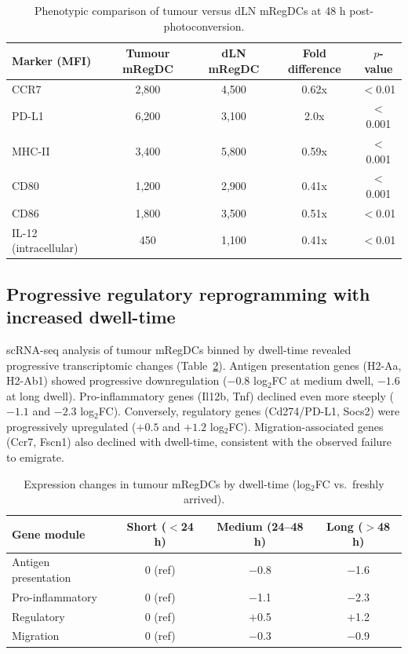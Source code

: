 \documentclass[11pt]{article}
\begin{document}
\begin{table}[h]
\centering
\caption{Phenotypic comparison of tumour versus dLN mRegDCs at 48 h post-photoconversion.}
\label{tab:phenotype}
\begin{tabular}{lcccc}
\toprule
Marker (MFI) & Tumour mRegDC & dLN mRegDC & Fold difference & $p$-value \\
\midrule
CCR7 & 2,800 & 4,500 & 0.62x & $<$0.01 \\
PD-L1 & 6,200 & 3,100 & 2.0x & $<$0.001 \\
MHC-II & 3,400 & 5,800 & 0.59x & $<$0.001 \\
CD80 & 1,200 & 2,900 & 0.41x & $<$0.001 \\
CD86 & 1,800 & 3,500 & 0.51x & $<$0.01 \\
IL-12 (intracellular) & 450 & 1,100 & 0.41x & $<$0.01 \\
\bottomrule
\end{tabular}
\end{table}

\subsection{Progressive regulatory reprogramming with increased dwell-time}
scRNA-seq analysis of tumour mRegDCs binned by dwell-time revealed progressive transcriptomic changes (Table~\ref{tab:temporal}). Antigen presentation genes (H2-Aa, H2-Ab1) showed progressive downregulation ($-0.8$ log$_2$FC at medium dwell, $-1.6$ at long dwell). Pro-inflammatory genes (Il12b, Tnf) declined even more steeply ($-1.1$ and $-2.3$ log$_2$FC). Conversely, regulatory genes (Cd274/PD-L1, Socs2) were progressively upregulated ($+0.5$ and $+1.2$ log$_2$FC). Migration-associated genes (Ccr7, Fscn1) also declined with dwell-time, consistent with the observed failure to emigrate.

\begin{table}[h]
\centering
\caption{Expression changes in tumour mRegDCs by dwell-time (log$_2$FC vs.\ freshly arrived).}
\label{tab:temporal}
\begin{tabular}{lccc}
\toprule
Gene module & Short ($<$24 h) & Medium (24--48 h) & Long ($>$48 h) \\
\midrule
Antigen presentation & 0 (ref) & $-$0.8 & $-$1.6 \\
Pro-inflammatory & 0 (ref) & $-$1.1 & $-$2.3 \\
Regulatory & 0 (ref) & $+$0.5 & $+$1.2 \\
Migration & 0 (ref) & $-$0.3 & $-$0.9 \\
\bottomrule
\end{tabular}
\end{table}
\end{document}
